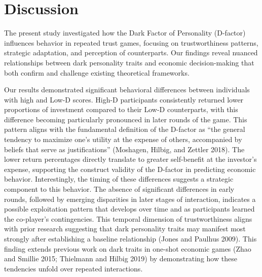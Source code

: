 \documentclass[
]{article}
\begin{document}
\section{Discussion}\label{discussion}

The present study investigated how the Dark Factor of Personality (D-factor) influences behavior in repeated trust games, focusing on trustworthiness patterns, strategic adaptation, and perception of counterparts. Our findings reveal nuanced relationships between dark personality traits and economic decision-making that both confirm and challenge existing theoretical frameworks.

Our results demonstrated significant behavioral differences between individuals with high and Low-D scores. High-D participants consistently returned lower proportions of investment compared to their Low-D counterparts, with this difference becoming particularly pronounced in later rounds of the game. This pattern aligns with the fundamental definition of the D-factor as ``the general tendency to maximize one's utility at the expense of others, accompanied by beliefs that serve as justifications'' (Moshagen, Hilbig, and Zettler 2018). The lower return percentages directly translate to greater self-benefit at the investor's expense, supporting the construct validity of the D-factor in predicting economic behavior.
Interestingly, the timing of these differences suggests a strategic component to this behavior. The absence of significant differences in early rounds, followed by emerging disparities in later stages of interaction, indicates a possible exploitation pattern that develops over time and as participants learned the co-player's contingencies. This temporal dimension of trustworthiness aligns with prior research suggesting that dark personality traits may manifest most strongly after establishing a baseline relationship (Jones and Paulhus 2009). This finding extends previous work on dark traits in one-shot economic games (Zhao and Smillie 2015; Thielmann and Hilbig 2019) by demonstrating how these tendencies unfold over repeated interactions.
\end{document}
